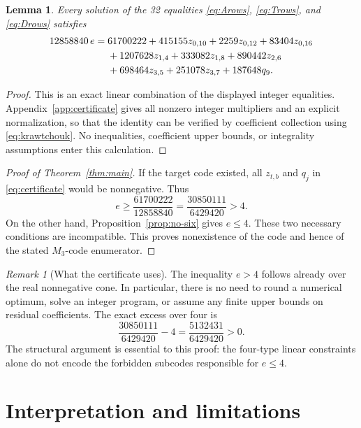 \documentclass[11pt]{article}
\newtheorem{lemma}[theorem]{Lemma}
\theoremstyle{remark}
\newtheorem{remark}[theorem]{Remark}
\begin{document}
\begin{lemma}\label{lem:certificate}
Every solution of the 32 equalities
\eqref{eq:Arows}, \eqref{eq:Trows}, and \eqref{eq:Drows} satisfies
\begin{align}
 12858840\,e={}&61700222
       +415155z_{0,10}+2259z_{0,12}+83404z_{0,16}\notag\\
       &+1207628z_{1,4}+333082z_{1,8}+890442z_{2,6}\notag\\
       &+698464z_{3,5}+251078z_{3,7}+187648q_9.
 \label{eq:certificate}
\end{align}
\end{lemma}

\begin{proof}
This is an exact linear combination of the displayed integer
equalities.  Appendix~\ref{app:certificate} gives all nonzero integer
multipliers and an explicit normalization, so that the identity can
be verified by coefficient collection using
\eqref{eq:krawtchouk}.  No inequalities, coefficient upper bounds,
or integrality assumptions enter this calculation.
\end{proof}

\begin{proof}[Proof of Theorem~\ref{thm:main}]
If the target code existed, all $z_{t,b}$ and $q_j$ in
\eqref{eq:certificate} would be nonnegative.  Thus
\[
 e\geq\frac{61700222}{12858840}
   =\frac{30850111}{6429420}>4.
\]
On the other hand, Proposition~\ref{prop:no-six} gives $e\leq4$.
These two necessary conditions are incompatible.  This proves
nonexistence of the code and hence of the stated $M_3$-code enumerator.
\end{proof}

\begin{remark}[What the certificate uses]
The inequality $e>4$ follows already over the real nonnegative cone.
In particular, there is no need to round a numerical optimum, solve an
integer program, or assume any finite upper bounds on residual
coefficients.  The exact excess over four is
\[
 \frac{30850111}{6429420}-4=\frac{5132431}{6429420}>0.
\]
The structural argument is essential to this proof: the four-type linear constraints
alone do not encode the forbidden subcodes responsible for $e\leq4$.
\end{remark}

\section{Interpretation and limitations}
\end{document}
